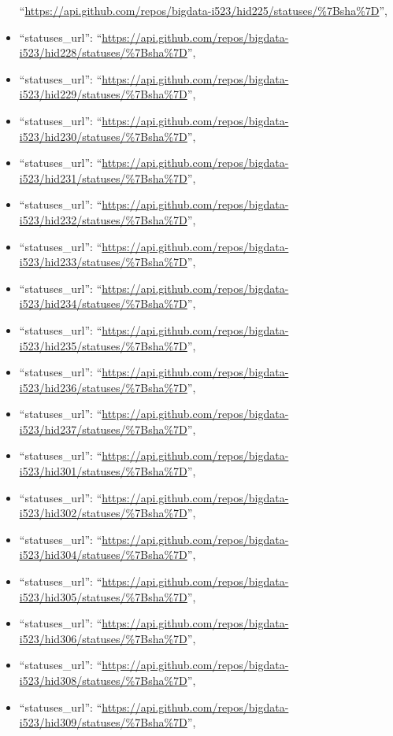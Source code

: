 \begin{itemize}
  ``\url{https://api.github.com/repos/bigdata-i523/hid225/statuses/\%7Bsha\%7D}'',
\item
  ``statuses\_url'':
  ``\url{https://api.github.com/repos/bigdata-i523/hid228/statuses/\%7Bsha\%7D}'',
\item
  ``statuses\_url'':
  ``\url{https://api.github.com/repos/bigdata-i523/hid229/statuses/\%7Bsha\%7D}'',
\item
  ``statuses\_url'':
  ``\url{https://api.github.com/repos/bigdata-i523/hid230/statuses/\%7Bsha\%7D}'',
\item
  ``statuses\_url'':
  ``\url{https://api.github.com/repos/bigdata-i523/hid231/statuses/\%7Bsha\%7D}'',
\item
  ``statuses\_url'':
  ``\url{https://api.github.com/repos/bigdata-i523/hid232/statuses/\%7Bsha\%7D}'',
\item
  ``statuses\_url'':
  ``\url{https://api.github.com/repos/bigdata-i523/hid233/statuses/\%7Bsha\%7D}'',
\item
  ``statuses\_url'':
  ``\url{https://api.github.com/repos/bigdata-i523/hid234/statuses/\%7Bsha\%7D}'',
\item
  ``statuses\_url'':
  ``\url{https://api.github.com/repos/bigdata-i523/hid235/statuses/\%7Bsha\%7D}'',
\item
  ``statuses\_url'':
  ``\url{https://api.github.com/repos/bigdata-i523/hid236/statuses/\%7Bsha\%7D}'',
\item
  ``statuses\_url'':
  ``\url{https://api.github.com/repos/bigdata-i523/hid237/statuses/\%7Bsha\%7D}'',
\item
  ``statuses\_url'':
  ``\url{https://api.github.com/repos/bigdata-i523/hid301/statuses/\%7Bsha\%7D}'',
\item
  ``statuses\_url'':
  ``\url{https://api.github.com/repos/bigdata-i523/hid302/statuses/\%7Bsha\%7D}'',
\item
  ``statuses\_url'':
  ``\url{https://api.github.com/repos/bigdata-i523/hid304/statuses/\%7Bsha\%7D}'',
\item
  ``statuses\_url'':
  ``\url{https://api.github.com/repos/bigdata-i523/hid305/statuses/\%7Bsha\%7D}'',
\item
  ``statuses\_url'':
  ``\url{https://api.github.com/repos/bigdata-i523/hid306/statuses/\%7Bsha\%7D}'',
\item
  ``statuses\_url'':
  ``\url{https://api.github.com/repos/bigdata-i523/hid308/statuses/\%7Bsha\%7D}'',
\item
  ``statuses\_url'':
  ``\url{https://api.github.com/repos/bigdata-i523/hid309/statuses/\%7Bsha\%7D}'',

\end{itemize}
